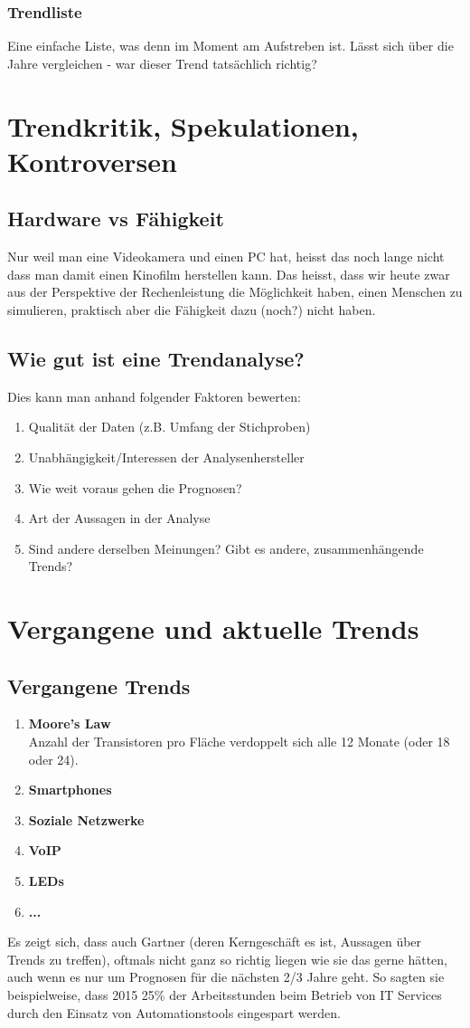 \subsubsection{Trendliste}
Eine einfache Liste, was denn im Moment am Aufstreben ist. Lässt sich über die Jahre vergleichen - war dieser Trend tatsächlich richtig?

\section{Trendkritik, Spekulationen, Kontroversen}
\subsection{Hardware vs Fähigkeit}
Nur weil man eine Videokamera und einen PC hat, heisst das noch lange nicht dass man damit einen Kinofilm herstellen kann. Das heisst, dass wir heute zwar aus der Perspektive der Rechenleistung die Möglichkeit haben, einen Menschen zu simulieren, praktisch aber die Fähigkeit dazu (noch?) nicht haben.
\subsection{Wie gut ist eine Trendanalyse?}
Dies kann man anhand folgender Faktoren bewerten:
\begin{enumerate}
	\item Qualität der Daten (z.B. Umfang der Stichproben)
	\item Unabhängigkeit/Interessen der Analysenhersteller
	\item Wie weit voraus gehen die Prognosen?
	\item Art der Aussagen in der Analyse
	\item Sind andere derselben Meinungen? Gibt es andere, zusammenhängende Trends?
\end{enumerate}

\section{Vergangene und aktuelle Trends}
\subsection{Vergangene Trends}
\begin{enumerate}
	\item \textbf{Moore's Law} \\
		Anzahl der Transistoren pro Fläche verdoppelt sich alle 12 Monate (oder 18 oder 24).
	\item \textbf{Smartphones}
	\item \textbf{Soziale Netzwerke}
	\item \textbf{VoIP}
	\item \textbf{LEDs}
	\item \textbf{...}
\end{enumerate}
Es zeigt sich, dass auch Gartner (deren Kerngeschäft es ist, Aussagen über Trends zu treffen), oftmals nicht ganz so richtig liegen wie sie das gerne hätten, auch wenn es nur um Prognosen für die nächsten 2/3 Jahre geht. So sagten sie beispielweise, dass 2015 25\% der Arbeitsstunden beim Betrieb von IT Services durch den Einsatz von Automationstools eingespart werden.
